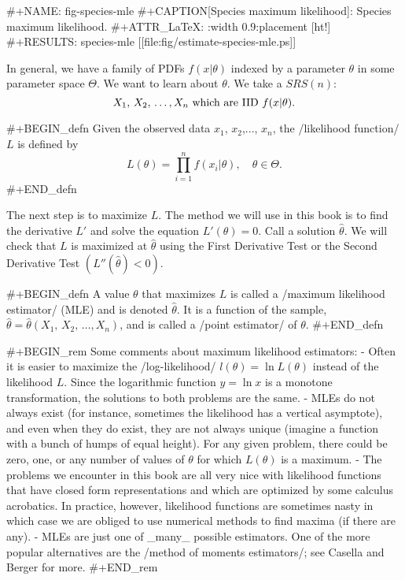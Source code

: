 #+NAME: fig-species-mle
#+CAPTION[Species maximum likelihood]: \small Species maximum likelihood.
#+ATTR_LaTeX: :width 0.9\textwidth :placement [ht!]
#+RESULTS: species-mle
[[file:fig/estimate-species-mle.ps]]

In general, we have a family of PDFs \(f(x|\theta)\) indexed by a
parameter \(\theta\) in some parameter space \(\Theta\). We want to
learn about \(\theta\). We take a \(SRS(n)\):
\begin{equation}
X_{1},\, X_{2},\,\ldots,X_{n}\mbox{ which are IID \( f(x| \theta ) \).}
\end{equation}

#+BEGIN_defn
Given the observed data \(x_{1}\), \(x_{2}\),..., \(x_{n}\), the
/likelihood function/ \(L\) is defined by \[
L(\theta)=\prod_{i=1}^{n}f(x_{i}|\theta),\quad \theta\in\Theta.  \]
#+END_defn

The next step is to maximize \(L\). The method we will use in this
book is to find the derivative \(L'\) and solve the equation
\(L'(\theta)=0\). Call a solution \(\hat{\theta}\). We will check that
\(L\) is maximized at \(\hat{\theta}\) using the First Derivative Test
or the Second Derivative Test \(\left(L''(\hat{\theta})<0\right)\).

#+BEGIN_defn
A value \(\theta\) that maximizes \(L\) is called a /maximum
likelihood estimator/ (MLE) and is denoted \(\hat{\theta}\). It is a
function of the sample, \(\hat{\theta}=\hat{\theta}\left(X_{1},\,
X_{2},\,\ldots,X_{n}\right)\), and is called a /point estimator/ of
\(\theta\).
#+END_defn

#+BEGIN_rem
Some comments about maximum likelihood estimators:
- Often it is easier to maximize the /log-likelihood/ \(l(\theta)=\ln
  L(\theta)\) instead of the likelihood \(L\). Since the logarithmic
  function \(y=\ln x\) is a monotone transformation, the solutions to
  both problems are the same.
- MLEs do not always exist (for instance, sometimes the likelihood has
  a vertical asymptote), and even when they do exist, they are not
  always unique (imagine a function with a bunch of humps of equal
  height). For any given problem, there could be zero, one, or any
  number of values of \(\theta\) for which \(L(\theta)\) is a maximum.
- The problems we encounter in this book are all very nice with
  likelihood functions that have closed form representations and which
  are optimized by some calculus acrobatics. In practice, however,
  likelihood functions are sometimes nasty in which case we are
  obliged to use numerical methods to find maxima (if there are any).
- MLEs are just one of _many_ possible estimators. One of the more
  popular alternatives are the /method of moments estimators/; see
  Casella and Berger \cite{Casella2002} for more.
#+END_rem

